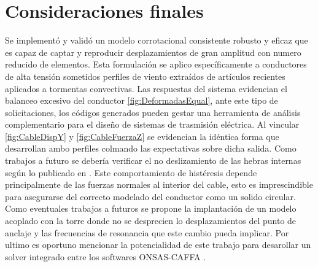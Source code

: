 \chapter{Consideraciones finales}
\linenumbers
Se implementó y validó un modelo corrotacional consistente robusto y eficaz que es capaz de captar y reproducir desplazamientos de gran amplitud con numero reducido de elementos.  Esta formulación se aplico específicamente a conductores de alta tensión sometidos perfiles de viento extraídos de artículos recientes aplicados a tormentas convectivas. Las respuestas del sistema evidencian el balanceo excesivo del conductor \ref{fig:DeformadasEqual}, ante este tipo de solicitaciones, los códigos generados pueden gestar una herramienta de análisis complementario para el diseño de sistemas de trasmisión eléctrica. Al vincular 		\ref{fig:CableDispY} y \ref{fig:CableFuerzaZ} se evidencian la idéntica forma que desarrollan ambo perfiles colmando las expectativas sobre dicha salida. Como trabajos a futuro se debería verificar el no deslizamiento de las hebras internas según lo publicado en \citet{foti2018finite}. Este comportamiento de histéresis depende principalmente de las fuerzas normales al interior del cable, esto es imprescindible para asegurarse del correcto modelado del conductor como un solido circular. Como eventuales trabajos a futuros se propone la implantación de un modelo acoplado con la torre donde no se desprecien lo desplazamientos del punto de anclaje y las frecuencias de resonancia que este cambio pueda implicar. Por ultimo es oportuno mencionar la potencialidad de este trabajo para desarollar un solver integrado entre los softwares ONSAS-CAFFA \cite{usera2008parallel}.


